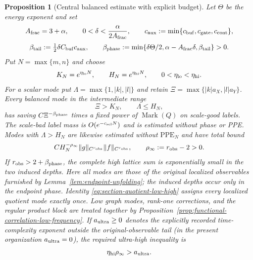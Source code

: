 \documentclass[11pt]{article}
\newtheorem{proposition}[theorem]{Proposition}
\begin{document}
\begin{proposition}[Central balanced estimate with explicit budget]
\label{prop:central-phase-verification}
Let \(\Theta\) be the energy exponent and set
\[
 A_{\rm frac}=3+\alpha,\qquad
 0<\delta<\frac{\alpha}{2A_{\rm frac}},\qquad
 c_{\rm aux}:=\min\{c_{\rm buf},c_{\rm gate},c_{\rm cont}\},
\]
\begin{equation}
\label{eq:complete-phase-exponent}
 \beta_{\rm tail}:=\tfrac12\delta C_{\rm buf}c_{\rm aux},\qquad
 \beta_{\rm phase}:=
 \min\{\delta\Theta/2,\alpha-A_{\rm frac}\delta,
             \beta_{\rm tail}\}>0.
\end{equation}
Put $N=\max\{m,n\}$ and choose
\begin{equation}
\label{eq:three-frequency-cutoffs}
 K_N=e^{\eta_{\rm lo}N},\qquad
 H_N=e^{\eta_{\rm hi}N},\qquad
 0<\eta_{\rm lo}<\eta_{\rm hi}.
\end{equation}
For a scalar mode put
$\Lambda=\max\{1,|k|,|l|\}$ and retain
$\Xi=\max\{|k|a_X,|l|a_Y\}$.  Every balanced mode in the intermediate range
\begin{equation}
\label{eq:intermediate-phase-range}
 \Xi>K_N,\qquad \Lambda\le H_N,
\end{equation}
has saving \(C\Xi^{-\beta_{\rm phase}}\) times a fixed power of
\(\operatorname{Mark}(Q)\) on scale-good labels.  The scale-bad label mass is
$O(e^{-c_{\rm scl}N})$ and is estimated without phase or PPE.  Modes with
$\Lambda>H_N$ are likewise estimated without
$\mathrm{PPE}_{N}$ and have total bound
\begin{equation}
\label{eq:ultra-high-observable-tail}
 C H_N^{-\rho_\infty}\|g\|_{C^{r_{\rm obs}}}
 \|f\|_{C^{r_{\rm obs}}},\qquad
 \rho_\infty:=r_{\rm obs}-2>0.
\end{equation}
If $r_{\rm obs}>2+\beta_{\rm phase}$, the complete high lattice sum is
exponentially small in the two induced depths.  Here all modes are those of the original
localized observables furnished by Lemma~\ref{lem:endpoint-unfolding}; the
induced depths occur only in the endpoint phase.  Identity
\eqref{eq:section-quotient-low-high} assigns every localized quotient mode
exactly once.  Low graph modes, rank-one corrections, and
the regular product block are treated together by
Proposition~\ref{prop:functional-correlation-low-frequency}.  If
$a_{\rm ultra}\ge0$ denotes the explicitly recorded time-complexity exponent
outside the original-observable tail (in the present organization
$a_{\rm ultra}=0$), the required ultra-high inequality is
\begin{equation}
\label{eq:ultra-high-exponent-window}
 \eta_{\rm hi}\rho_\infty>a_{\rm ultra}.
\end{equation}
\end{proposition}
\end{document}

